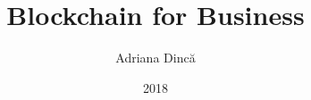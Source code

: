 \title{Blockchain for Business}
\author{Adriana Dincă}
\date{2018}



\newcommand{\project}{Blockchain for Business}

